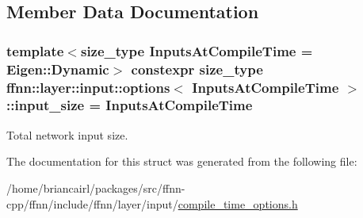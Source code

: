 \subsection{Member Data Documentation}
\hypertarget{structffnn_1_1layer_1_1input_1_1options_a3d31a36c926c1926e653e5e19e034b82}{
\subsubsection[{input\-\_\-size}]{\setlength{\rightskip}{0pt plus 5cm}template$<$size\-\_\-type Inputs\-At\-Compile\-Time = Eigen\-::\-Dynamic$>$ constexpr {\bf size\-\_\-type} {\bf ffnn\-::layer\-::input\-::options}$<$ Inputs\-At\-Compile\-Time $>$\-::input\-\_\-size = Inputs\-At\-Compile\-Time\hspace{0.3cm}{\ttfamily [static]}}}\label{structffnn_1_1layer_1_1input_1_1options_a3d31a36c926c1926e653e5e19e034b82}


Total network input size. 



The documentation for this struct was generated from the following file\-:\begin{DoxyCompactItemize}
\item 
/home/briancairl/packages/src/ffnn-\/cpp/ffnn/include/ffnn/layer/input/\hyperlink{input_2compile__time__options_8h}{compile\-\_\-time\-\_\-options.\-h}\end{DoxyCompactItemize}
